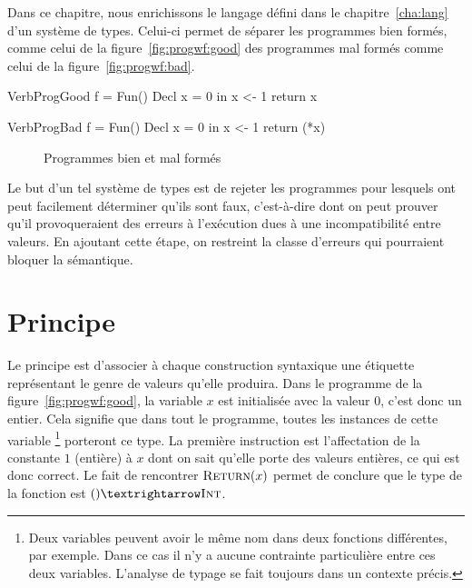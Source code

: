 Dans ce chapitre, nous enrichissons le langage défini dans le
chapitre~\ref{cha:lang} d'un système de types. Celui-ci permet de séparer les
programmes bien formés, comme celui de la figure~\ref{fig:progwf:good} des
programmes mal formés comme celui de la figure~\ref{fig:progwf:bad}.

\begin{SaveVerbatim}[]{VerbProgGood}
f = Fun() {
  Decl x = 0 in
  x <- 1
  return x
}
\end{SaveVerbatim}

\begin{SaveVerbatim}[]{VerbProgBad}
f = Fun() {
  Decl x = 0 in
  x <- 1
  return (*x)
}
\end{SaveVerbatim}

\begin{figure}[h]

  \centering

  \hspace{2cm}

  \caption{Programmes bien et mal formés}
\label{fig:progwf}

\end{figure}

Le but d'un tel système de types est de rejeter les programmes pour lesquels ont
peut facilement déterminer qu'ils sont faux, c'est-à-dire dont on peut prouver
qu'il provoqueraient des erreurs à l'exécution dues à une incompatibilité entre
valeurs. En ajoutant cette étape, on restreint la classe d'erreurs qui
pourraient bloquer la sémantique.

\section{Principe}

Le principe est d'associer à chaque construction syntaxique une étiquette
représentant le genre de valeurs qu'elle produira. Dans le programme de la
figure~\ref{fig:progwf:good}, la variable $x$ est initialisée avec la valeur
$0$, c'est donc un entier. Cela signifie que dans tout le programme, toutes les
instances de cette variable
\footnote{Deux variables peuvent avoir le même nom dans deux fonctions
  différentes, par exemple. Dans ce cas il n'y a aucune contrainte particulière
  entre ces deux variables. L'analyse de typage se fait toujours dans un
  contexte précis.
}
porteront ce type. La première instruction est l'affectation de la constante $1$
(entière) à $x$ dont on sait qu'elle porte des valeurs entières, ce qui est donc
correct. Le fait de rencontrer $\textsc{Return}(x)$ permet de conclure que le type de
la fonction est $() → \tInt$.

